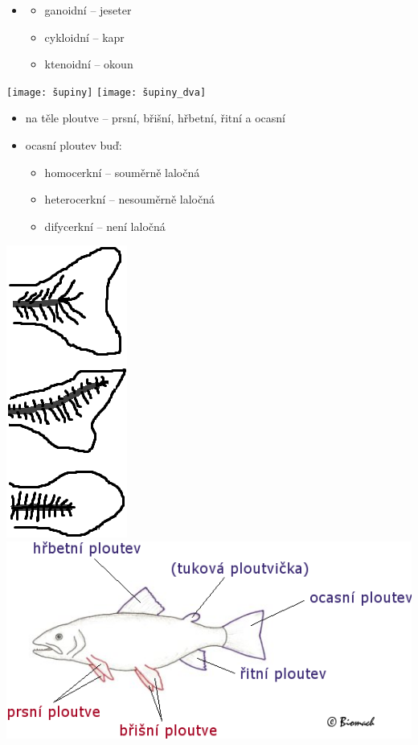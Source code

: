 \documentclass{article}
\begin{document}
\hspace{-0.03185\textwidth}\begin{minipage}{0.275\textwidth}\raggedleft
  \begin{itemize}
    \item[]
    \begin{itemize}
      \item ganoidní -- jeseter
      \item cykloidní -- kapr
      \item ktenoidní -- okoun
    \end{itemize}
  \end{itemize}
\end{minipage}
\noindent\begin{minipage}{0.715\textwidth}
  \texttt{[image: šupiny]}
  \texttt{[image: šupiny\_dva]}
\end{minipage}

\hspace{-0.03185\textwidth}\begin{minipage}{0.535\textwidth}\raggedleft
  \begin{itemize}
    \item na těle ploutve -- prsní, břišní, hřbetní, řitní a ocasní
    \item ocasní ploutev buď:
    \begin{itemize}
      \item homocerkní -- souměrně laločná
      \item heterocerkní -- nesouměrně laločná
      \item difycerkní -- není laločná
    \end{itemize}
  \end{itemize}
\end{minipage}
\hspace{-0.08\textwidth}\noindent\begin{minipage}{0.455\textwidth}
  \includegraphics[width=0.09\linewidth]{ocasni_ploutev}
  \hspace{0.1\textwidth}
  \includegraphics[width=0.75\linewidth]{ploutve}
\end{minipage}
\end{document}
